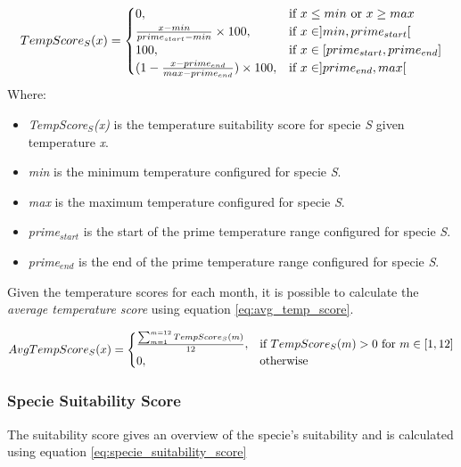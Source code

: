 \begin{equation}
\centering
TempScore_{S}(x) = 
\begin{cases}
    0, & \text{if } x \leq min \text{ or } x \geq max \\
    \frac{x - min}{prime_{start} - min} \times 100, & \text{if } x \in ]min,prime_{start}[ \\
    100, & \text{if } x \in [prime_{start},prime_{end}] \\
    (1 - \frac{x - prime_{end}}{max-prime_{end}}) \times 100, & \text{if } x \in ]prime_{end},max[ \\
\end{cases}
\label{eq:monthly_temp_score}
\end{equation}
Where:
\begin{itemize}
\item \textit{TempScore$_{S}$(x)} is the temperature suitability score for specie \textit{S} given temperature \textit{x}.
\item \textit{min} is the minimum temperature configured for specie \textit{S}.
\item \textit{max} is the maximum temperature configured for specie \textit{S}.
\item \textit{prime$_{start}$} is the start of the prime temperature range configured for specie \textit{S}.
\item \textit{prime$_{end}$} is the end of the prime temperature range configured for specie \textit{S}.
\end{itemize}

Given the temperature scores for each month, it is possible to calculate the \textit{average temperature score} using equation \ref{eq:avg_temp_score}.

\begin{equation}
\centering
AvgTempScore_{S}(x) =
\begin{cases}
	\frac{\sum_{m=1}^{m=12} TempScore_{S}(m)}{12}, & \text{if } TempScore_{S}(m) > 0 \text{ for } m \in [1,12] \\
    0,              & \text{otherwise}
\end{cases}
\label{eq:avg_temp_score}
\end{equation}

\subsubsection{Specie Suitability Score}

The suitability score gives an overview of the specie's suitability and is calculated using equation \ref{eq:specie_suitability_score}


